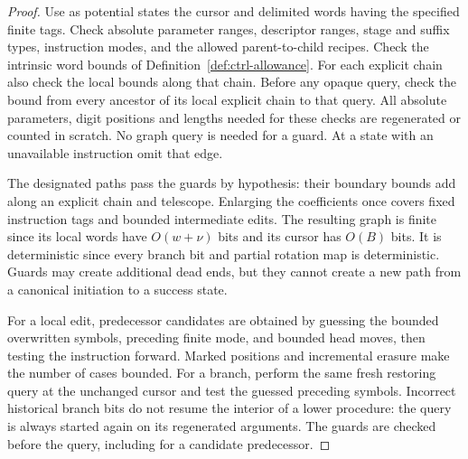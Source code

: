 \begin{proof}
Use as potential states the cursor and delimited words having the
specified finite tags.  Check absolute parameter ranges, descriptor
ranges, stage and suffix types, instruction modes, and the allowed
parent-to-child recipes.  Check the intrinsic word bounds of
Definition~\ref{def:ctrl-allowance}.  For each explicit chain also check
the local bounds along that chain.  Before any opaque query, check the
bound from every ancestor of its local explicit chain to that query.
All absolute parameters, digit positions and lengths needed for these checks are
regenerated or counted in scratch.  No graph query is needed for a
guard.  At a state with an unavailable instruction omit that edge.

The designated paths pass the guards by hypothesis: their boundary
bounds add along an explicit chain and telescope.  Enlarging the
coefficients once covers fixed instruction tags and bounded intermediate
edits.  The resulting graph is finite since its local words have
$O(w+\nu)$ bits and its cursor has $O(B)$ bits.  It is deterministic since
every branch bit and partial rotation map is deterministic.  Guards may
create additional dead ends, but they cannot create a new path from a
canonical initiation to a success state.

For a local edit, predecessor candidates are obtained by guessing the
bounded overwritten symbols, preceding finite mode, and bounded head
moves, then testing the instruction forward.  Marked positions and
incremental erasure make the number of cases bounded.  For a branch,
perform the same fresh restoring query at the unchanged cursor and test
the guessed preceding symbols.  Incorrect historical branch bits do not
resume the interior of a lower procedure: the query is always started
again on its regenerated arguments.  The guards are checked before the
query, including for a candidate predecessor.


\end{proof}
